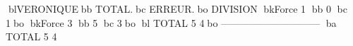 blVERONIQUEbb           TOTAL.bc      ERREUR.bo
DIVISION
bkForce      1     bb  0	bc        1bo
bkForce      3     bb  5	bc        3bo
bl TOTAL             5	        4bo
------------------------------
ba TOTAL             5	        4
